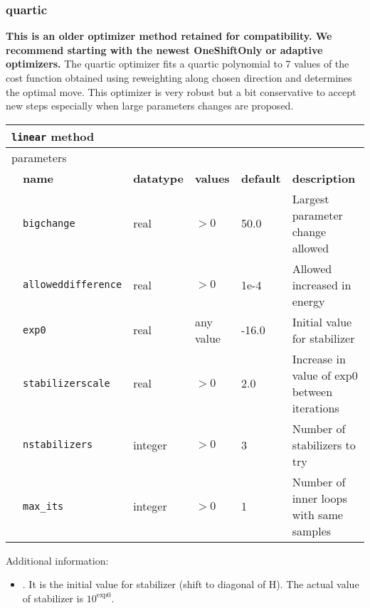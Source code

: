 \subsubsection{quartic}
\textbf{This is an older optimizer method retained for compatibility. We recommend starting with the newest OneShiftOnly or adaptive optimizers.}
The quartic optimizer fits a quartic polynomial to 7 values of the cost function obtained using reweighting along chosen direction and determines the optimal move.
This optimizer is very robust but a bit conservative to accept new steps especially when large parameters changes are proposed.
\begin{table}[h]
\begin{center}
\begin{tabularx}{\textwidth}{l l l l l X }
\hline
\multicolumn{6}{l}{\texttt{linear} method} \\
\hline
\multicolumn{2}{l}{parameters}  & \multicolumn{4}{l}{}\\
   &   \bfseries name     & \bfseries datatype & \bfseries values & \bfseries default   & \bfseries description \\
   &   \texttt{bigchange} &  real     & $>0$ & 50.0  & Largest parameter change allowed\\
   &   \texttt{alloweddifference} &  real     & $>0$ & 1e-4 & Allowed increased in energy\\
   &   \texttt{exp0} &  real     & any value & -16.0 & Initial value for stabilizer\\
   &   \texttt{stabilizerscale} &  real     & $>0$ & 2.0 & Increase in value of exp0 between iterations\\
   &   \texttt{nstabilizers} &  integer     & $>0$ & 3 & Number of stabilizers to try\\
   &   \texttt{max\_its} &  integer   & $>0$ & 1 & Number of inner loops with same samples\\
  \hline
\end{tabularx}
\end{center}
\end{table}

Additional information:
\begin{itemize}
\item {}. It is the initial value for stabilizer (shift to diagonal of H). The actual value of stabilizer is $10^{\textrm{exp0}}$.
\end{itemize}

